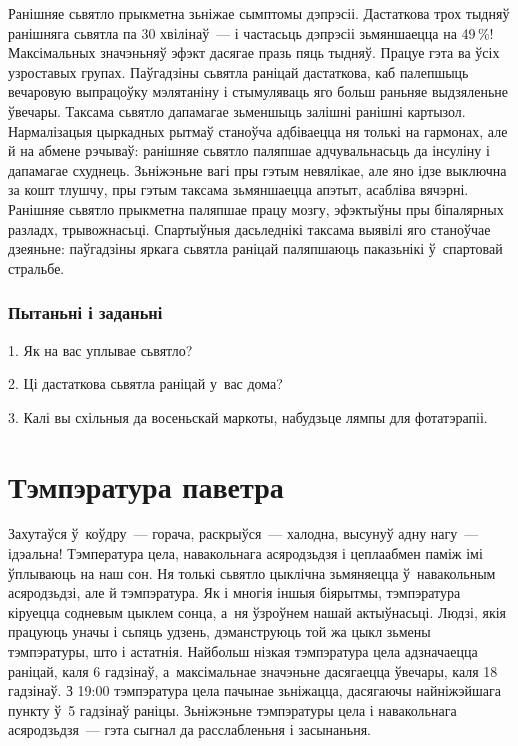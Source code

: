 Ранішняе сьвятло прыкметна зьніжае сымптомы дэпрэсіі. Дастаткова трох тыдняў ранішняга сьвятла па 30 хвілінаў~--- і частасьць дэпрэсіі зьмяншаецца на 49\,\%! Максімальных значэньняў эфэкт дасягае празь пяць тыдняў. Працуе гэта ва ўсіх узроставых групах. Паўгадзіны сьвятла раніцай дастаткова, каб палепшыць вечаровую выпрацоўку мэлятаніну і стымуляваць яго больш раньняе выдзяленьне ўвечары. Таксама сьвятло дапамагае зьменшыць залішні ранішні картызол. Нармалізацыя цыркадных рытмаў станоўча адбіваецца ня толькі на гармонах, але й на абмене рэчываў: ранішняе сьвятло паляпшае адчувальнасьць да інсуліну і дапамагае схуднець. Зьніжэньне вагі пры гэтым невялікае, але яно ідзе выключна за кошт тлушчу, пры гэтым таксама зьмяншаецца апэтыт, асабліва вячэрні. Ранішняе сьвятло прыкметна паляпшае працу мозгу, эфэктыўны пры біпалярных разладх, трывожнасьці. Спартыўныя дасьледнікі таксама выявілі яго станоўчае дзеяньне: паўгадзіны яркага сьвятла раніцай паляпшаюць паказьнікі ў~спартовай стральбе.

\subsubsection{Пытаньні і заданьні}

1. Як на вас уплывае сьвятло?

2. Ці дастаткова сьвятла раніцай у~вас дома?

3. Калі вы схільныя да восеньскай маркоты, набудзьце лямпы для фотатэрапіі.


\section{Тэмпэратура паветра}

Захутаўся ў~коўдру~--- горача, раскрыўся~--- халодна, высунуў адну нагу~--- ідэальна! Тэмпература цела, навакольнага асяродзьдзя і цеплаабмен паміж імі ўплываюць на наш сон. Ня толькі сьвятло цыклічна зьмяняецца ў~навакольным асяродзьдзі, але й тэмпэратура. Як і многія іншыя біярытмы, тэмпэратура кіруецца содневым цыклем сонца, а~ня ўзроўнем нашай актыўнасьці. Людзі, якія працуюць уначы і сьпяць удзень, дэманструюць той жа цыкл зьмены тэмпэратуры, што і астатнія. Найбольш нізкая тэмпэратура цела адзначаецца раніцай, каля 6 гадзінаў, а~максімальнае значэньне дасягаецца ўвечары, каля 18 гадзінаў. З 19:00 тэмпэратура цела пачынае зьніжацца, дасягаючы найніжэйшага пункту ў~5 гадзінаў раніцы. Зьніжэньне тэмпэратуры цела і навакольнага асяродзьдзя~--- гэта сыгнал да расслабленьня і засынаньня.

